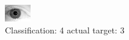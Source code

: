 \begin{figure}[h!]
\begin{center}
\includegraphics[width=0.60\columnwidth]{figures/ID2158_class_4_target_3.png}
\end{center}
\caption{ Classification: 4 actual target: 3}
\label{fig:ID2158_class_4_target_3}
\end{figure}
